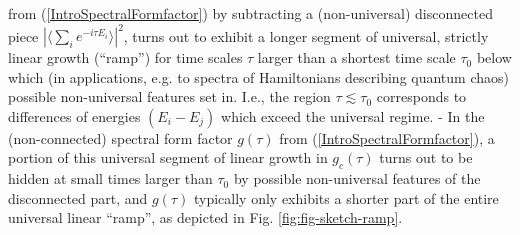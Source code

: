 \documentclass[aps,prb,preprint,onecolumn,amsmath,amssymb,superscriptaddress,eqsecnum,floatfix,scrartcl]{revtex4-1}
\begin{document}
 from (\ref{IntroSpectralFormfactor})
by subtracting a (non-universal) disconnected piece
$|\langle\sum_{i} e^{-i \tau E_i}\rangle|^2$,  turns out to exhibit a longer
segment of universal, strictly linear growth (``ramp'') for time scales $\tau$
larger than a shortest  time scale $\tau_0$ below which (in applications, e.g.  to spectra of Hamiltonians describing quantum chaos) possible
 non-universal features set in.
I.e., the region $\tau \lesssim \tau_0$ corresponds to differences of energies $ (E_i-E_j)$ which exceed the universal regime.
- In the (non-connected) spectral form factor
$g(\tau)$ from (\ref{IntroSpectralFormfactor}),  a portion of this universal segment of linear growth  in $g_c(\tau)$
turns out to be
hidden at small times larger than $\tau_0$ by  possible  non-universal features of the
disconnected part, and $g(\tau)$ typically only exhibits a shorter  part of the entire  universal linear ``ramp'',
as depicted  in Fig. \ref{fig:fig-sketch-ramp}.

\end{document}
